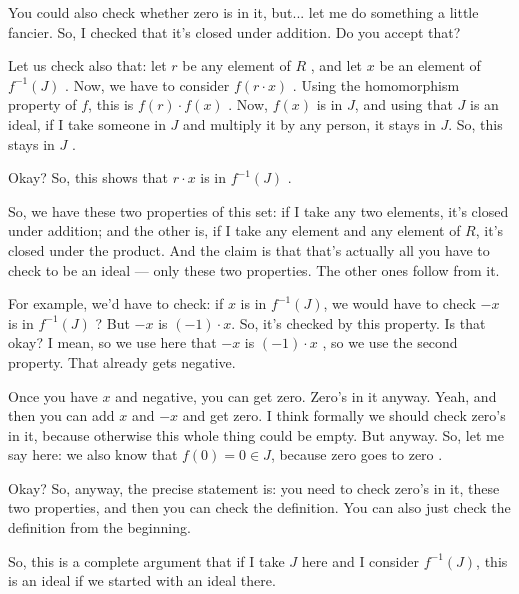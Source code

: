 \begin{speech}[00:11:51 - 00:14:42]
You could also check whether zero is in it, but... let me do something a little fancier. So, I checked that it's closed under addition. Do you accept that?

Let us check also that: let $r$ be any element of $R$ , and let $x$ be an element of $f^{-1}(J)$ . Now, we have to consider $f(r \cdot x)$ . Using the homomorphism property of $f$, this is $f(r) \cdot f(x)$ . Now, $f(x)$ is in $J$, and using that $J$ is an ideal, if I take someone in $J$ and multiply it by any person, it stays in $J$. So, this stays in $J$ .

Okay? So, this shows that $r \cdot x$ is in $f^{-1}(J)$ .

So, we have these two properties of this set: if I take any two elements, it's closed under addition; and the other is, if I take any element and any element of $R$, it's closed under the product. And the claim is that that's actually all you have to check to be an ideal --- only these two properties. The other ones follow from it.

For example, we'd have to check: if $x$ is in $f^{-1}(J)$, we would have to check $-x$ is in $f^{-1}(J)$ ? But $-x$ is $(-1) \cdot x$. So, it's checked by this property. Is that okay? I mean, so we use here that $-x$ is $(-1) \cdot x$ , so we use the second property. That already gets negative.

Once you have $x$ and negative, you can get zero. Zero's in it anyway. Yeah, and then you can add $x$ and $-x$ and get zero. I think formally we should check zero's in it, because otherwise this whole thing could be empty. But anyway. So, let me say here: we also know that $f(0) = 0 \in J$, because zero goes to zero .

Okay? So, anyway, the precise statement is: you need to check zero's in it, these two properties, and then you can check the definition. You can also just check the definition from the beginning.

So, this is a complete argument that if I take $J$ here and I consider $f^{-1}(J)$, this is an ideal if we started with an ideal there.
\end{speech}

